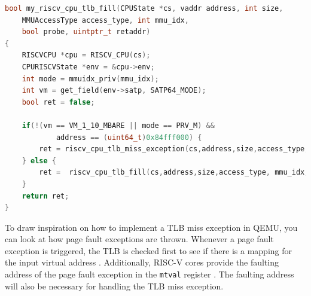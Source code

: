 \begin{lstlisting}[language=c,float=h!,
    caption={Alternative Implementation for the RISC-V tlb\_fill function with a special case to
    start testing TLB miss Handler implementations.
    In line 11, a conditional branch is used to only trigger the exception when neither the
    Virtual Memory (as set in the \texttt{satp} \texttt{MODE} field) is bare nor the privilege
    mode is the machine mode.
    If the virtual address is the hardcoded one, a TLB miss exception is thrown, otherwise the
    original functions is called, which will perform a page table walk to find the mapping.},
    label={lst:specialCaseTLBfill}]
bool my_riscv_cpu_tlb_fill(CPUState *cs, vaddr address, int size,
    MMUAccessType access_type, int mmu_idx,
    bool probe, uintptr_t retaddr)
{
    RISCVCPU *cpu = RISCV_CPU(cs);
    CPURISCVState *env = &cpu->env;
    int mode = mmuidx_priv(mmu_idx);
    int vm = get_field(env->satp, SATP64_MODE);
    bool ret = false;

    if(!(vm == VM_1_10_MBARE || mode == PRV_M) &&
            address == (uint64_t)0x84fff000) {
        ret = riscv_cpu_tlb_miss_exception(cs,address,size,access_type, mmu_idx, probe, retaddr);
    } else {
        ret =  riscv_cpu_tlb_fill(cs,address,size,access_type, mmu_idx, probe, retaddr);
    }
    return ret;
}
\end{lstlisting}



To draw inspiration on how to implement a TLB miss exception in QEMU, you can look at how
page fault exceptions are thrown.
Whenever a page fault exception is triggered, the TLB is checked first to see if there is a mapping
for the input virtual address \cite{QEMUSource2024}. Additionally, RISC-V cores provide the faulting
address of the page fault exception in the \texttt{mtval} register \cite{RISCVInstructionSet}.
The faulting address will also be necessary for handling the TLB miss exception.




